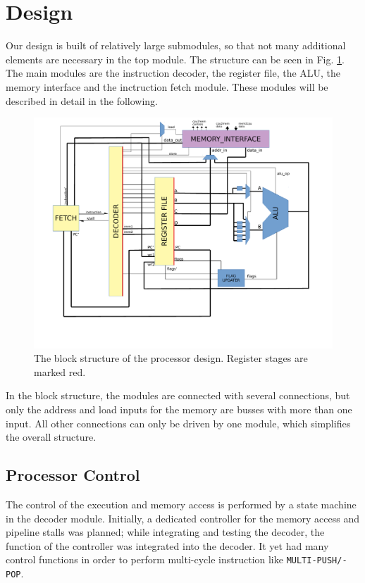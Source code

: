 \section{Design}
\label{sec:design}
Our design is built of relatively large submodules, so that not many additional elements are necessary in the top module. The structure can be seen in Fig. \ref{fig:processoroverview}. The main modules are the instruction decoder, the register file, the ALU, the memory interface and the inctruction fetch module. These modules will be described in detail in the following.

\begin{figure}[ht]
\centering
\includegraphics[scale=0.65]{images/processorOverview.pdf}
\caption{The block structure of the processor design. Register stages are marked red.}
\label{fig:processoroverview}
\end{figure}

In the block structure, the modules are connected with several connections, but only the address and load inputs for the memory are busses with more than one input. All other connections can only be driven by one module, which simplifies the overall structure. 

\subsection{Processor Control}
\label{subsec:processorcontrol}
The control of the execution and memory access is performed by a state machine in the decoder module. Initially, a dedicated controller for the memory access and pipeline stalls was planned; while integrating and testing the decoder, the function of the controller was integrated into the decoder. It yet had many control functions in order to perform multi-cycle instruction like \texttt{MULTI-PUSH/-POP}.


